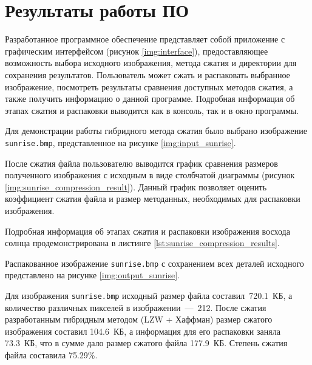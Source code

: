 \section{Результаты работы ПО}

Разработанное программное обеспечение представляет собой приложение с графическим интерфейсом (рисунок \ref{img:interface}), предоставляющее возможность выбора исходного изображения, метода сжатия и директории для сохранения результатов. Пользователь может сжать и распаковать выбранное изображение, посмотреть результаты сравнения доступных методов сжатия, а также получить информацию о данной программе.
Подробная информация об этапах сжатия и распаковки выводится как в консоль, так и в окно программы.


\clearpage

Для демонстрации работы гибридного метода сжатия было выбрано изображение \texttt{sunrise.bmp}, представленное на рисунке \ref{img:input_sunrise}.


После сжатия файла пользователю выводится график сравнения размеров полученного изображения с исходным в виде столбчатой диаграммы (рисунок \ref{img:sunrise_compression_result}). Данный график позволяет оценить коэффициент сжатия файла и размер методанных, необходимых для распаковки изображения.


Подробная информация об этапах сжатия и распаковки изображения восхода солнца продемонстрирована в листинге \ref{lst:sunrise_compression_results}.


Распакованное изображение \texttt{sunrise.bmp} с сохранением всех деталей исходного представлено на рисунке \ref{img:output_sunrise}.


Для изображения \texttt{sunrise.bmp} исходный размер файла составил~720.1~КБ, а количество различных пикселей в изображении~---~212. После сжатия разработанным гибридным методом (LZW + Хаффман) размер сжатого изображения составил 104.6~КБ, а информация для его распаковки заняла 73.3~КБ, что в сумме дало размер сжатого файла 177.9~КБ. Степень сжатия файла составила 75.29\%. 

